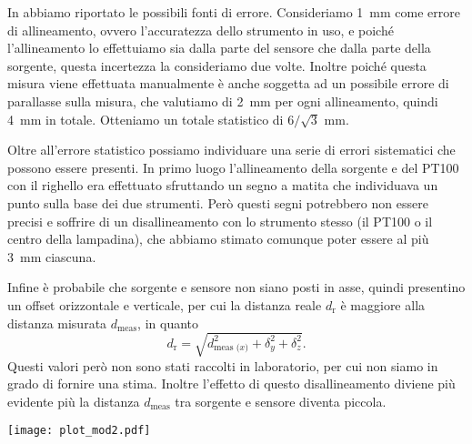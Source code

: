 \documentclass[
    rmp,
    reprint, 
    superscriptaddress, 
    altaffilletter, 
    amsmath, 
    amssymb,
    a4paper]{revtex4-2}
\begin{document}
In  abbiamo riportato le possibili fonti di errore. Consideriamo \SI{1}{\milli\metre} come errore di allineamento, ovvero l'accuratezza dello strumento in uso, e poiché l'allineamento lo effettuiamo sia dalla parte del sensore che dalla parte della sorgente, questa incertezza la consideriamo due volte. Inoltre poiché questa misura viene effettuata manualmente è anche soggetta ad un possibile errore di parallasse sulla misura, che valutiamo di \SI{2}{\milli\metre} per ogni allineamento, quindi \SI{4}{\milli\metre} in totale. Otteniamo un totale statistico di $6/\sqrt{3}$ mm.

Oltre all'errore statistico possiamo individuare una serie di errori sistematici che possono essere presenti. In primo luogo l'allineamento della sorgente e del PT100 con il righello era effettuato sfruttando un segno a matita che individuava un punto sulla base dei due strumenti. Però questi segni potrebbero non essere precisi e soffrire di un disallineamento con lo strumento stesso (il PT100 o il centro della lampadina), che abbiamo stimato comunque poter essere al più \SI{3}{\milli\metre} ciascuna. 

Infine è probabile che sorgente e sensore non siano posti in asse, quindi presentino un offset orizzontale e verticale, per cui la distanza reale $d_{\text{r}}$ è maggiore alla distanza misurata $d_{\text{meas}}$, in quanto 
\[
    d_{\text{r}} = \sqrt{d_{\text{meas ($x$)}}^2 + \delta_y^2 + \delta_z^2}.
\]
Questi valori però non sono stati raccolti in laboratorio, per cui non siamo in grado di fornire una stima. Inoltre l'effetto di questo disallineamento diviene più evidente più la distanza $d_{\text{meas}}$ tra sorgente e sensore diventa piccola.


\begin{figure*}
    \texttt{[image: plot\_mod2.pdf]}
    \caption{\textbf{Applicazione del secondo modello di analisi dei dati}. A sinistra abbiamo i diversi dati raccolti su cui eseguiamo un fit lineare entro un intorno del punto che vogliamo misurare, per poter effettuare una misura ad una data distanza temporale, poiché i dati non si presentano continui. Si può inoltre osservare come di fatto dopo circa \SI[parse-numbers=false]{30/40}{\second} il comportamento della tensione diventi lineare, in accordo con quanto ipotizzato possa essere il suo comportamento pratico. A destra invece troviamo più chiaro il comportamento $d^{a}$ come  previsto, anche se qualitativamente non è facile individuare il range in cui $a$ può trovarsi. L'errore è quello valutato a seguito di una analisi sulle incertezze sistematiche, la banda orizzontale segna questa incertezza complessiva, i marker verticali indicano dove era stimato l'errore precedente a queste considerazioni. Questo cambiamento è ben visibile sopratutto nel primo punto.}
    \label{fig:plot:mod2}
\end{figure*}
\end{document}
